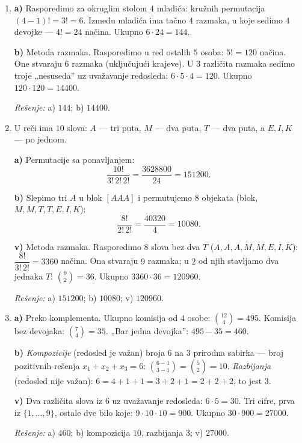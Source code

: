 \begin{enumerate}[label=\arabic*.]
\textbf{v)} Parnost: poslednja cifra $\in\{0,2,4\}$. Ako je poslednja $0$: $5\cdot 4\cdot 3=60$. Ako je poslednja $2$ ili $4$ ($2$ mogućnosti): prva nije $0$ ni izabrana poslednja ($4$ mogućnosti), dalje $4\cdot 3$, to jest $4\cdot 4\cdot 3=48$ za svaku, ukupno $96$. Ukupno $60+96=156$.

\emph{Rešenje:} a) $300$; \; b) $108$; \; v) $156$.

\item \textbf{a)} Rasporedimo za okruglim stolom $4$ mladića: kružnih permutacija $(4-1)!=3!=6$. Između mladića ima tačno $4$ razmaka, u koje sedimo $4$ devojke — $4!=24$ načina. Ukupno $6\cdot 24=144$.

\textbf{b)} Metoda razmaka. Rasporedimo u red ostalih $5$ osoba: $5!=120$ načina. One stvaraju $6$ razmaka (uključujući krajeve). U $3$ različita razmaka sedimo troje „nesuseda” uz uvažavanje redosleda: $6\cdot 5\cdot 4=120$. Ukupno $120\cdot 120=14400$.

\emph{Rešenje:} a) $144$; \; b) $14400$.

\item U reči ima $10$ slova: $A$ — tri puta, $M$ — dva puta, $T$ — dva puta, a $E,I,K$ — po jednom.

\textbf{a)} Permutacije sa ponavljanjem:
\[
\frac{10!}{3!\,2!\,2!}=\frac{3628800}{24}=151200.
\]

\textbf{b)} Slepimo tri $A$ u blok $[AAA]$ i permutujemo $8$ objekata (blok, $M,M,T,T,E,I,K$):
\[
\frac{8!}{2!\,2!}=\frac{40320}{4}=10080.
\]

\textbf{v)} Metoda razmaka. Rasporedimo $8$ slova bez dva $T$ ($A,A,A,M,M,E,I,K$): $\dfrac{8!}{3!\,2!}=3360$ načina. Ona stvaraju $9$ razmaka; u $2$ od njih stavljamo dva jednaka $T$: $\binom{9}{2}=36$. Ukupno $3360\cdot 36=120960$.

\emph{Rešenje:} a) $151200$; \; b) $10080$; \; v) $120960$.

\item \textbf{a)} Preko komplementa. Ukupno komisija od $4$ osobe: $\binom{12}{4}=495$. Komisija bez devojaka: $\binom{7}{4}=35$. „Bar jedna devojka”: $495-35=460$.

\textbf{b)} \emph{Kompozicije} (redosled je važan) broja $6$ na $3$ prirodna sabirka — broj pozitivnih rešenja $x_1+x_2+x_3=6$: $\binom{6-1}{3-1}=\binom{5}{2}=10$. \emph{Razbijanja} (redosled nije važan): $6=4+1+1=3+2+1=2+2+2$, to jest $3$.

\textbf{v)} Dva različita slova iz $6$ uz uvažavanje redosleda: $6\cdot 5=30$. Tri cifre, prva iz $\{1,\dots,9\}$, ostale dve bilo koje: $9\cdot 10\cdot 10=900$. Ukupno $30\cdot 900=27000$.

\emph{Rešenje:} a) $460$; \; b) kompozicija $10$, razbijanja $3$; \; v) $27000$.
\end{enumerate}


